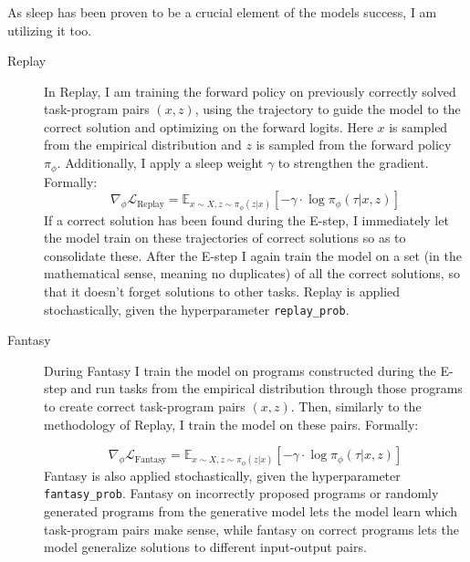 \subsubsection{}
As sleep has been proven to be a crucial element of the models success, I am utilizing it too. 
\begin{description}
    \item[Replay] In Replay, I am training the forward policy on previously correctly solved task-program pairs $(x, z)$, using the trajectory to guide the model to the correct solution and optimizing on the forward logits. Here $x$ is sampled from the empirical distribution and $z$ is sampled from the forward policy $\pi_\phi$. Additionally, I apply a sleep weight $\gamma$ to strengthen the gradient. Formally:
    \begin{equation}
        \nabla_\phi\mathcal{L}_{\text{Replay}} = \mathbb{E}_{x \sim X, z \sim \pi_\phi(z|x)} \left[ - \gamma \cdot \log \pi_\phi(\tau \vert x, z) \right]
    \end{equation}
    If a correct solution has been found during the E-step, I immediately let the model train on these trajectories of correct solutions so as to consolidate these.
After the E-step I again train the model on a set (in the mathematical sense, meaning no duplicates) of all the correct solutions, so that it doesn't forget solutions to other tasks.
Replay is applied stochastically, given the hyperparameter \texttt{replay\_prob}.
    
    \item[Fantasy] During Fantasy I train the model on programs constructed during the E-step and run tasks from the empirical distribution through those programs to create correct task-program pairs $(x, z)$. Then, similarly to the methodology of Replay, I train the model on these pairs. Formally:

    \begin{equation}
        \nabla_\phi\mathcal{L}_{\text{Fantasy}} = \mathbb{E}_{x \sim X, z \sim \pi_\phi(z|x)} \left[ - \gamma \cdot \log \pi_\phi(\tau \vert x, z) \right]
    \end{equation}
    Fantasy is also applied stochastically, given the hyperparameter \texttt{fantasy\_prob}. 
    Fantasy on incorrectly proposed programs or randomly generated programs from the generative model lets the model learn which task-program pairs make sense, while fantasy on correct programs lets the model generalize solutions to different input-output pairs.
\end{description}


